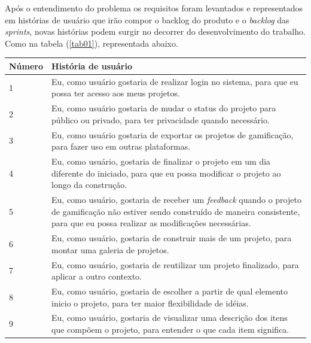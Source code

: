 Após o entendimento do problema os requisitos foram levantados e representados em histórias de usuário que irão compor o backlog do produto e o \textit{backlog} das \textit{sprints}, novas histórias podem surgir no decorrer do desenvolvimento do trabalho. Como na tabela (\ref{tab01}), representada abaixo.


\begin{table}[!htpb]
\centering
\begin{tabular}{|p{1.5cm}|p{12cm}|} \hline

 Número & História de usuário \\ \hline

 1 & Eu, como usuário gostaria de realizar login no sistema, para que eu possa ter acesso aos meus projetos. \\ \hline

 2 & Eu, como usuário gostaria de mudar o status do projeto para público ou privado,  para ter privacidade quando necessário. \\ \hline

 3 & Eu, como usuário gostaria  de exportar os projetos de gamificação, para fazer uso em outras plataformas. \\ \hline

 4 & Eu, como usuário, gostaria de finalizar o projeto em um dia diferente do iniciado, para que eu possa modificar o projeto ao longo da construção. \\ \hline

 5 & Eu, como usuário, gostaria de receber um \textit{feedback} quando o projeto de gamificação não estiver sendo construído de maneira consistente, para que eu possa realizar as modificações necessárias. \\ \hline

 6 & Eu, como usuário, gostaria de construir mais de um projeto, para montar uma galeria de projetos. \\ \hline

 7 & Eu, como usuário, gostaria de reutilizar um projeto finalizado, para aplicar a outro contexto. \\ \hline

 8 & Eu, como usuário, gostaria de escolher a partir de qual elemento inicio o projeto, para ter maior flexibilidade de idéias. \\ \hline

 9 & Eu, como usuário, gostaria de visualizar uma descrição dos itens que compõem o projeto, para entender o que cada item significa. \\ \hline


\end{tabular}
\end{table}
